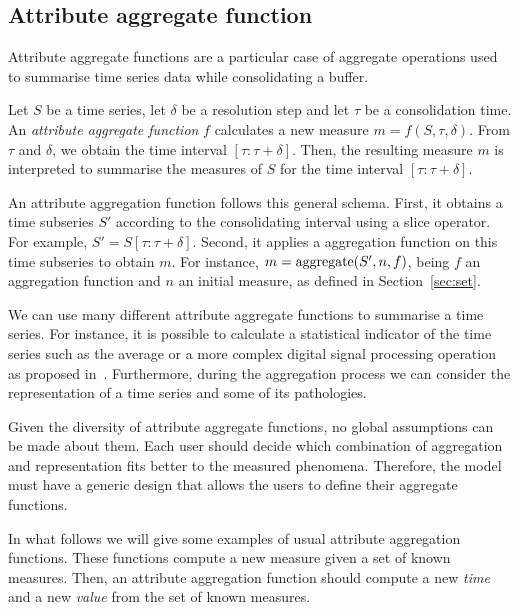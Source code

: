 \subsection{Attribute aggregate function}
\label{sec:model:interpolador}

Attribute aggregate functions are a particular case of 
aggregate operations used to summarise time series data while
consolidating a buffer.

Let $S$ be a time series, let $\delta$ be a resolution step and let
$\tau$ be a consolidation time.  An \emph{attribute aggregate
  function} $f$ calculates a new measure $m=f(S,\tau,\delta)$. From
$\tau$ and $\delta$, we obtain the time interval $[\tau:\tau+\delta]$.
Then, the resulting measure $m$ is interpreted to summarise the
measures of $S$ for the time interval $[\tau:\tau+\delta]$.

An attribute aggregation function follows this general schema. First,
it obtains a time subseries $S'$ according to the consolidating
interval using a slice operator. For example, $S' =
S[\tau:\tau+\delta]$. Second, it applies a  aggregation
function on this time subseries to obtain $m$. For instance, $m =
\operatorname*{aggregate}(S',n, f)$, being $f$ an aggregation function and $n$ an initial
measure, as defined in Section~\ref{sec:set}.

We can use many different attribute aggregate functions to summarise a
time series. For instance, it is possible to calculate a statistical
indicator of the time series such as the average or a more complex
digital signal processing operation as proposed
in~\cite{zhang11}. Furthermore, during the aggregation process we can
consider the representation of a time series and some of its
pathologies.

Given the diversity of attribute aggregate functions, no global
assumptions can be made about them. Each user should decide which
combination of aggregation and representation fits better to the
measured phenomena.  Therefore, the  model must have a
generic design that allows the users to define their aggregate
functions.

In what follows we will give some examples of usual attribute
aggregation functions. These functions compute a new measure given a
set of known measures. Then, an attribute aggregation function should
compute a new \emph{time} and a new \emph{value} from the set of known
measures.

